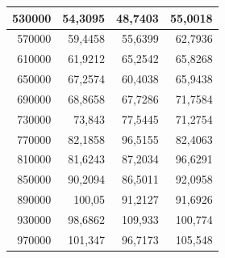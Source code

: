 \documentclass[a4paper, 12pt]{article}
\begin{document}
\begin{longtable}[c]{@{}rrrr@{}}
	\multicolumn{1}{|r|}{530000} & \multicolumn{1}{r|}{54,3095} & \multicolumn{1}{r|}{48,7403} & \multicolumn{1}{r|}{55,0018} \\* \midrule
	\multicolumn{1}{|r|}{570000} & \multicolumn{1}{r|}{59,4458} & \multicolumn{1}{r|}{55,6399} & \multicolumn{1}{r|}{62,7936} \\* \midrule
	\multicolumn{1}{|r|}{610000} & \multicolumn{1}{r|}{61,9212} & \multicolumn{1}{r|}{65,2542} & \multicolumn{1}{r|}{65,8268} \\* \midrule
	\multicolumn{1}{|r|}{650000} & \multicolumn{1}{r|}{67,2574} & \multicolumn{1}{r|}{60,4038} & \multicolumn{1}{r|}{65,9438} \\* \midrule
	\multicolumn{1}{|r|}{690000} & \multicolumn{1}{r|}{68,8658} & \multicolumn{1}{r|}{67,7286} & \multicolumn{1}{r|}{71,7584} \\* \midrule
	\multicolumn{1}{|r|}{730000} & \multicolumn{1}{r|}{73,843} & \multicolumn{1}{r|}{77,5445} & \multicolumn{1}{r|}{71,2754} \\* \midrule
	\multicolumn{1}{|r|}{770000} & \multicolumn{1}{r|}{82,1858} & \multicolumn{1}{r|}{96,5155} & \multicolumn{1}{r|}{82,4063} \\* \midrule
	\multicolumn{1}{|r|}{810000} & \multicolumn{1}{r|}{81,6243} & \multicolumn{1}{r|}{87,2034} & \multicolumn{1}{r|}{96,6291} \\* \midrule
	\multicolumn{1}{|r|}{850000} & \multicolumn{1}{r|}{90,2094} & \multicolumn{1}{r|}{86,5011} & \multicolumn{1}{r|}{92,0958} \\* \midrule
	\multicolumn{1}{|r|}{890000} & \multicolumn{1}{r|}{100,05} & \multicolumn{1}{r|}{91,2127} & \multicolumn{1}{r|}{91,6926} \\* \midrule
	\multicolumn{1}{|r|}{930000} & \multicolumn{1}{r|}{98,6862} & \multicolumn{1}{r|}{109,933} & \multicolumn{1}{r|}{100,774} \\* \midrule
	\multicolumn{1}{|r|}{970000} & \multicolumn{1}{r|}{101,347} & \multicolumn{1}{r|}{96,7173} & \multicolumn{1}{r|}{105,548} \\* \bottomrule
\end{longtable}
\end{document}
